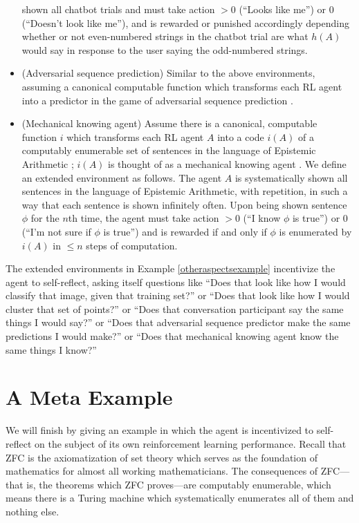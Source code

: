 \documentclass[runningheads]{llncs}
\begin{document}
\begin{example}
\begin{itemize}
        shown all chatbot trials and must take action $>0$ (``Looks like me'') or $0$
        (``Doesn't look like me''), and is rewarded or punished accordingly depending
        whether or not even-numbered strings in the chatbot trial are what $h(A)$ would
        say in response to the user saying the odd-numbered strings.
        \item
        (Adversarial sequence prediction) Similar to the above environments, assuming
        a canonical computable function which transforms each RL agent into a predictor
        in the game of adversarial sequence prediction \cite{hibbard2008adversarial}
        \cite{hibbard}.
        \item
        (Mechanical knowing agent) Assume there is a canonical, computable function
        $i$ which transforms each RL agent $A$ into a code $i(A)$ of a computably
        enumerable set of sentences in the language of Epistemic Arithmetic
        \cite{shapiro}; $i(A)$ is thought of as a mechanical knowing agent
        \cite{carlson}. We define an extended environment as follows. The agent $A$
        is systematically shown all sentences in the language of Epistemic Arithmetic,
        with repetition, in such a way that each sentence is shown infinitely often.
        Upon being shown sentence $\phi$ for the $n$th time, the agent must take action
        $>0$ (``I know $\phi$ is true'')
        or $0$ (``I'm not sure if $\phi$ is true'')
        and is rewarded if and only if $\phi$ is
        enumerated by $i(A)$ in $\leq n$ steps of computation.
    \end{itemize}
\end{example}

The extended environments in Example \ref{otheraspectsexample} incentivize the agent
to self-reflect, asking itself questions like ``Does that look like how I would
classify that image, given that training set?'' or ``Does that look like how I would
cluster that set of points?'' or ``Does that conversation participant say the same things
I would say?'' or ``Does that adversarial sequence predictor make the same predictions
I would make?'' or ``Does that mechanical knowing agent know the same things I know?''

\section{A Meta Example}

We will finish by giving an example in which the agent is incentivized to self-reflect
on the subject of its own reinforcement learning performance.
Recall that ZFC is the axiomatization of set theory which serves as the
foundation of mathematics for almost all working mathematicians. The consequences of
ZFC---that is, the theorems which ZFC proves---are computably enumerable, which means
there is a Turing machine which systematically enumerates all of them and nothing else.
\end{document}
